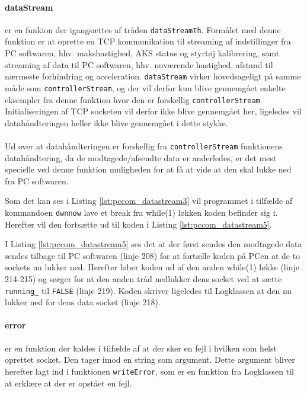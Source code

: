 \paragraph{dataStream} er en funkion der igangsættes af tråden \texttt{dataStreamTh}. Formålet med denne funktion er at oprette en TCP kommunikation til streaming af indstillinger fra PC softwaren, hhv. makshastighed, AKS status og styrtøj kalibrering, samt streaming af data til PC softwaren, hhv. nuværende hastighed, afstand til nærmeste forhindring og acceleration. \texttt{dataStream} virker hovedsageligt på samme måde som \texttt{controllerStream}, og der vil derfor kun blive gennemgået enkelte eksempler fra denne funktion hvor den er forskellig \texttt{controllerStream}. Initialiseringen af TCP socketen vil derfor ikke blive gennemgået her, ligeledes vil datahåndteringen heller ikke blive gennemgået i dette stykke.\\\\
Ud over at datahåndteringen er forskellig fra \texttt{controllerStream} funktionens datahåndtering, da de modtagede/afsendte data er anderledes, er det mest specielle ved denne funktion muligheden for at få at vide at den skal lukke ned fra PC softwaren. 



Som det kan ses i Listing \ref{lst:pccom_datastream3} vil programmet i tilfælde af kommandoen \texttt{dwnnow} lave et break fra while(1) løkken koden befinder sig i. Herefter vil den fortsætte ud til koden i Listing \ref{lst:pccom_datastream5}.



I Listing \ref{lst:pccom_datastream5} ses det at der først sendes den modtagede data sendes tilbage til PC softwaren (linje 208) for at fortælle koden på PCen at de to sockets nu lukker ned. Herefter løber koden ud af den anden while(1) løkke (linje 214-215) og sørger for at den anden tråd nedlukker dens socket ved at sætte \texttt{running\_} til \texttt{FALSE} (linje 219). Koden skriver ligeledes til Logklassen at den nu lukker ned for dens data socket (linje 218).

\clearpage

\paragraph{error} er en funktion der kaldes i tilfælde af at der sker en fejl i hvilken som helst oprettet socket. Den tager imod en string som argument. Dette argument bliver herefter lagt ind i funktionen \texttt{writeError}, som er en funktion fra Logklassen til at erklære at der er opstået en fejl.


